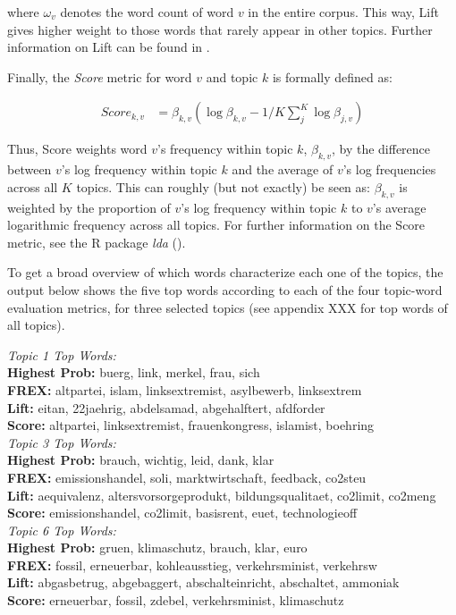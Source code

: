 \documentclass[12pt]{article}
\begin{document}
where $\omega_{v}$ denotes the word count of word $v$ in the entire corpus. This way, Lift gives higher weight to those words that rarely appear in other topics. Further information on Lift can be found in \cite{taddy2012estimation}.

Finally, the \textit{Score} metric for word $v$ and topic $k$ is formally defined as:

\begin{align*}
Score_{k,v} &= \beta_{k,v}(\log\beta_{k,v} - 1/K\sum_{j}^{K}\log\beta_{j,v})
\end{align*}

Thus, Score weights word $v$'s frequency within topic $k$, $\beta_{k,v}$, by the difference between $v$'s log frequency within topic $k$ and the average of $v$'s log frequencies across all $K$ topics. This can roughly (but not exactly) be seen as: $\beta_{k,v}$ is weighted by the proportion of $v$'s log frequency within topic $k$ to $v$'s average logarithmic frequency across all topics. For further information on the Score metric, see the R package \textit{lda} (\cite{chang2010package}).

To get a broad overview of which words characterize each one of the topics, the output below shows the five top words according to each of the four topic-word evaluation metrics, for three selected topics (see appendix XXX for top words of all topics).

\vspace{0.5cm}
\noindent
\textit{Topic 1 Top Words:}\\
 	 \textbf{Highest Prob:} buerg, link, merkel, frau, sich \\
 	 \textbf{FREX:} altpartei, islam, linksextremist, asylbewerb, linksextrem \\
 	 \textbf{Lift:} eitan, 22jaehrig, abdelsamad, abgehalftert, afdforder \\
 	 \textbf{Score:} altpartei, linksextremist, frauenkongress, islamist, boehring \\
\textit{Topic 3 Top Words:}\\
 	 \textbf{Highest Prob:} brauch, wichtig, leid, dank, klar \\
 	 \textbf{FREX:} emissionshandel, soli, marktwirtschaft, feedback, co2steu \\
 	 \textbf{Lift:} aequivalenz, altersvorsorgeprodukt, bildungsqualitaet, co2limit, co2meng \\
 	 \textbf{Score:} emissionshandel, co2limit, basisrent, euet, technologieoff \\
\textit{Topic 6 Top Words:}\\
 	 \textbf{Highest Prob:} gruen, klimaschutz, brauch, klar, euro \\
 	 \textbf{FREX:} fossil, erneuerbar, kohleausstieg, verkehrsminist, verkehrsw \\
 	 \textbf{Lift:} abgasbetrug, abgebaggert, abschalteinricht, abschaltet, ammoniak \\ 
 	 \textbf{Score:} erneuerbar, fossil, zdebel, verkehrsminist, klimaschutz \\
\vspace{0.5cm}
\end{document}

